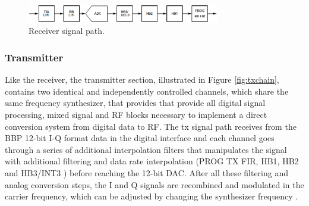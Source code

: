 \begin{figure}[htbp]
    \centering
    \includegraphics[width=0.75\textwidth]{./figures/rx_chain}
    \caption{ Receiver signal path.
    \label{fig:rxchain}}
\end{figure}


\subsubsection{Transmitter}




Like the receiver, the transmitter section, illustrated in Figure
\ref{fig:txchain}, contains two identical and independently controlled channels,
which share the same frequency synthesizer, that provides that provide all
digital signal processing, mixed signal and RF blocks necessary to implement a
direct conversion system from digital data to RF. The tx signal path receives
from the BBP 12-bit I-Q format data in the digital interface and each channel
goes through a series of additional interpolation filters that manipulates the
signal with additional filtering and data rate interpolation (PROG TX FIR, HB1,
HB2 and HB3/INT3 ) before reaching the 12-bit DAC. After all these filtering and
analog conversion steps, the I and Q signals are recombined and modulated in the
carrier frequency, which can be adjusted by changing the synthesizer frequency
\cite{ad:ad9361}.

